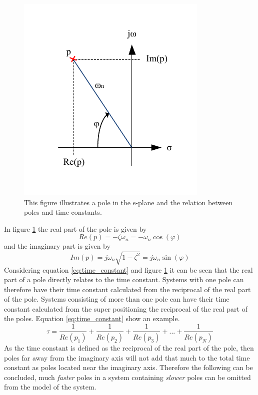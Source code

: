 \begin{figure}[htb]
	\centering
	\includegraphics[scale=1,clip,trim=0 20 0 20]{graphics/splane.pdf} %
	\caption{This figure illustrates a pole in the s-plane and the relation between poles and time constants.}
	\label{fig:s_plane}			%
\end{figure}
In figure \ref{fig:s_plane} the real part of the pole is given by 
\begin{equation}
	Re(p) = - \zeta\omega_{n} = - \omega_{n} \cos(\varphi)
\end{equation}
and the imaginary part is given by
\begin{equation}
	Im(p) = j\omega_{n}\sqrt{1 - \zeta^{2}} = j\omega_{n}\sin(\varphi)
\end{equation}
Considering equation \ref{eq:time_constant} and figure \ref{fig:s_plane} it can be seen that the real part of a pole directly relates to the time constant. Systems with one pole can therefore have their time constant calculated from the reciprocal of the real part of the pole. Systems consisting of more than one pole can have their time constant calculated from the super positioning the reciprocal of the real part of the poles. Equation \ref{eq:time_constant} show an example.
\begin{equation}
	\tau = \frac{1}{Re(p_{1})} + \frac{1}{Re(p_{2})} + \frac{1}{Re(p_{3})} + ... + \frac{1}{Re(p_{N})}\label{eq:super_time_constant}
\end{equation}
As the time constant is defined as the reciprocal of the real part of the pole, then poles far away from the imaginary axis will not add that much to the total time constant as poles located near the imaginary axis. Therefore the following can be concluded, much \textit{faster} poles in a system containing \textit{slower} poles can be omitted from the model of the system.

